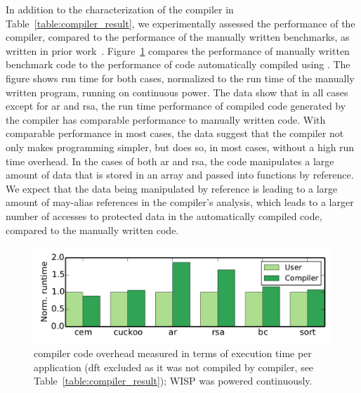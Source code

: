 In addition to the characterization of the \sys compiler in Table~\ref{table:compiler_result},  
we experimentally assessed the performance of the \sys compiler, compared to the performance
of the manually written benchmarks, as written in prior work~\cite{alpaca,chain}. 
%
Figure~\ref{fig:comp_user} compares the performance of manually written
benchmark code to the performance of code automatically compiled using \sys.
The figure shows run time for both cases, normalized to the run time of the
manually written program, running on continuous power.
%
The data show that in all cases except for ar and rsa, the run time performance
of compiled code generated by the \sys compiler has comparable performance to
manually written code.  With comparable performance in most cases, the data
suggest that the \sys compiler not only makes programming simpler, but does so,
in most cases, without a high run time overhead.  In the cases of both ar and
rsa, the code manipulates a large amount of data that is stored in an array and
passed into functions by reference.   We expect that the data being manipulated
by reference is leading to a large amount of may-alias references in the
compiler's analysis, which leads to a larger number of accesses to protected
data in the automatically compiled code, compared to the manually written code.


\begin{figure}
	\centering
	\includegraphics[width=\columnwidth]{figures/comp_user}
	\caption{\sys compiler code overhead measured in terms of execution time per application (dft excluded as it was not compiled by \sys compiler, see Table~\ref{table:compiler_result}); WISP was powered continuously.}
	\label{fig:comp_user}
\end{figure}






